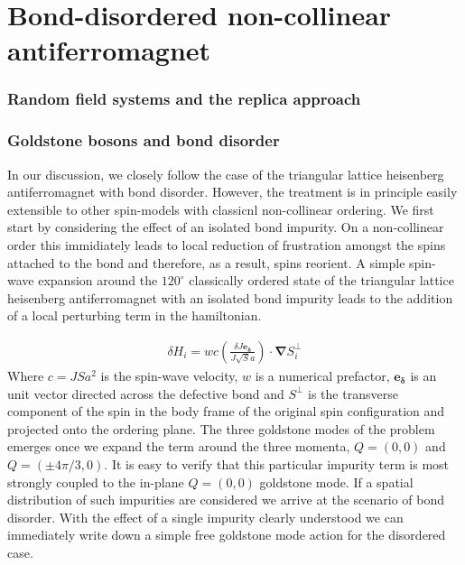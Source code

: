 \documentclass[notitlepage,onecolumn,showpacs,11pt]{revtex4-1}
\newcommand{\bsym}[1]{\boldsymbol{#1}}
\newcommand{\mbf}[1]{\mathbf{#1}}
\newcommand{\grad}{\boldsymbol{\nabla}}
\begin{document}
\section{Bond-disordered non-collinear antiferromagnet}

\subsubsection{Random field systems and the replica approach}

\subsubsection{Goldstone bosons and bond disorder}

In our discussion, we closely follow the case of the triangular lattice heisenberg 
antiferromagnet with bond disorder. However, the treatment is in principle easily extensible 
to other spin-models with classicnl non-collinear ordering. We first start by considering 
the effect of an isolated bond impurity. On a non-collinear order this immidiately leads to
local reduction of frustration amongst the spins attached to the bond and therefore, as a 
result, spins reorient. A simple spin-wave expansion around the $120^\circ$ classically
ordered state of the triangular lattice heisenberg antiferromagnet with an isolated bond
impurity leads to the addition of a local perturbing term in the hamiltonian.

\begin{equation}
    \begin{aligned}
        \delta H_i = w c \left(\frac{\delta J\mbf{e}_{\bsym{\delta}}}{J\sqrt{S}a}\right)
        \cdot\grad S_i^\perp
    \end{aligned}
\end{equation}
Where $c = JSa^2$ is the spin-wave velocity, $w$ is a numerical prefactor, 
$\mathbf{e}_{\bsym{\delta}}$ is an unit vector directed across the defective bond and $S^\perp$
is the transverse component of the spin in the body frame of the original spin configuration
and projected onto the ordering plane. The three goldstone modes of the problem emerges
once we expand the term around the three momenta, $Q=(0,0)$ and $Q=(\pm4\pi/3,0)$. It is 
easy to verify that this particular impurity term is most strongly coupled to the in-plane
$Q=(0,0)$ goldstone mode. If a spatial distribution of such impurities are considered we 
arrive at the scenario of bond disorder. With the effect of a single impurity clearly 
understood we can immediately write down a simple free goldstone mode action for the 
disordered case.
\end{document}
